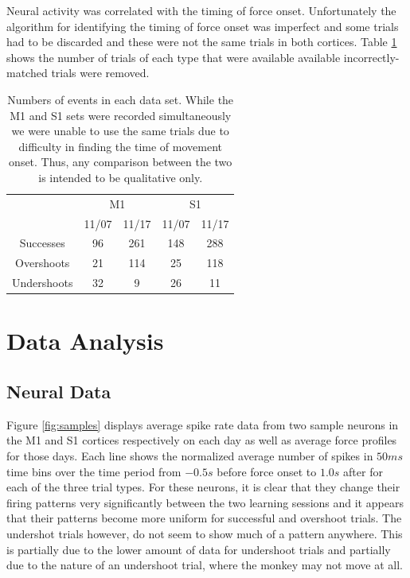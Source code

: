 \documentclass[11pt,a4paper]{article}
\begin{document}
Neural activity was correlated with the timing of force onset. Unfortunately the algorithm for identifying the timing of force onset was imperfect and some trials had to be discarded and these were not the same trials in both cortices. Table \ref{table:n-trials-by-type} shows the number of trials of each type that were available available incorrectly-matched trials were removed. 

\begin{table}[h]
\begin{tabular}{|c|c|c|c|c|}
\hline 
 & \multicolumn{2}{c|}{M1} & \multicolumn{2}{c|}{S1} \\ 
\cline{2-5}
 & 11/07 & 11/17 & 11/07 & 11/17 \\ 
\hline 
Successes & 96 & 261 & 148 & 288 \\ 
\hline 
Overshoots & 21 & 114 & 25 & 118 \\ 
\hline 
Undershoots & 32 & 9 & 26 & 11 \\ 
\hline 
\end{tabular}
\caption{Numbers of events in each data set. While the M1 and S1 sets were recorded simultaneously we were unable to use the same trials due to difficulty in finding the time of movement onset. Thus, any comparison between the two is intended to be qualitative only.}\label{table:n-trials-by-type}
\end{table}

\section{Data Analysis}

\subsection{Neural Data}
Figure \ref{fig:samples} displays average spike rate data from two sample neurons in the M1 and S1 cortices respectively on each day as well as average force profiles for those days. Each line shows the normalized average number of spikes in $50ms$ time bins over the time period from $-0.5s$ before force onset to $1.0s$ after for each of the three trial types. For these neurons, it is clear that they change their firing patterns very significantly between the two learning sessions and it appears that their patterns become more uniform for successful and overshoot trials. The undershot trials however, do not seem to show much of a pattern anywhere. This is partially due to the lower amount of data for undershoot trials and partially due to the nature of an undershoot trial, where the monkey may not move at all.
\end{document}
